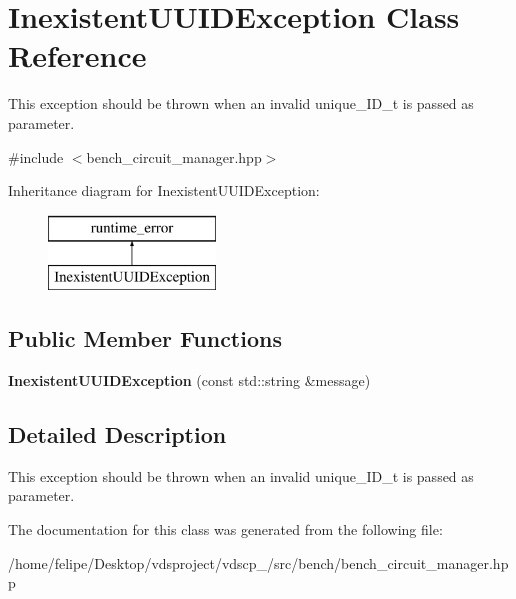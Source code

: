 \section{Inexistent\+U\+U\+I\+D\+Exception Class Reference}
\label{classInexistentUUIDException}


This exception should be thrown when an invalid unique\+\_\+\+I\+D\+\_\+t is passed as parameter.  




{\ttfamily \#include $<$bench\+\_\+circuit\+\_\+manager.\+hpp$>$}

Inheritance diagram for Inexistent\+U\+U\+I\+D\+Exception\+:\begin{figure}[H]
\begin{center}
\leavevmode
\includegraphics[height=2.000000cm]{classInexistentUUIDException}
\end{center}
\end{figure}
\subsection*{Public Member Functions}
\begin{DoxyCompactItemize}
\item 
{\bfseries Inexistent\+U\+U\+I\+D\+Exception} (const std\+::string \&message)\label{classInexistentUUIDException_a3a63e43f2b5d726f2cb99a90ff382cbf}

\end{DoxyCompactItemize}


\subsection{Detailed Description}
This exception should be thrown when an invalid unique\+\_\+\+I\+D\+\_\+t is passed as parameter. 

The documentation for this class was generated from the following file\+:\begin{DoxyCompactItemize}
\item 
/home/felipe/\+Desktop/vdsproject/vdscp\+\_/src/bench/bench\+\_\+circuit\+\_\+manager.\+hpp\end{DoxyCompactItemize}
